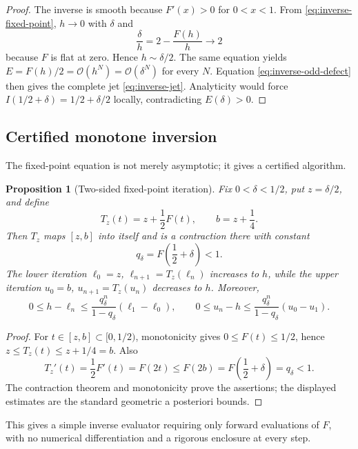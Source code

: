 \documentclass[11pt,oneside]{article}
\newtheorem{proposition}[theorem]{Proposition}
\theoremstyle{definition}
\theoremstyle{remark}
\newcommand{\bigO}{\mathcal O}
\begin{document}
\begin{proof}
The inverse is smooth because $F'(x)>0$ for $0<x<1$.  From \eqref{eq:inverse-fixed-point}, $h\to0$ with $\delta$ and
\[
 \frac\delta h=2-\frac{F(h)}h\longrightarrow2
\]
because $F$ is flat at zero.  Hence $h\sim\delta/2$.  The same equation yields
$E=F(h)/2=\bigO(h^N)=\bigO(\delta^N)$ for every $N$.  Equation \eqref{eq:inverse-odd-defect} then gives the complete jet \eqref{eq:inverse-jet}.  Analyticity would force $I(1/2+\delta)=1/2+\delta/2$ locally, contradicting $E(\delta)>0$.
\end{proof}

\subsection{Certified monotone inversion}
The fixed-point equation is not merely asymptotic; it gives a certified algorithm.

\begin{proposition}[Two-sided fixed-point iteration]
\label{prop:certified-iteration}
Fix $0<\delta<1/2$, put $z=\delta/2$, and define
\[
 T_z(t)=z+\frac12F(t),
 \qquad b=z+\frac14.
\]
Then $T_z$ maps $[z,b]$ into itself and is a contraction there with constant
\begin{equation}
 q_\delta=F\!\left(\frac12+\delta\right)<1.
 \label{eq:qdelta}
\end{equation}
The lower iteration $\ell_0=z$, $\ell_{n+1}=T_z(\ell_n)$ increases to $h$, while the upper iteration $u_0=b$, $u_{n+1}=T_z(u_n)$ decreases to $h$.  Moreover,
\begin{equation}
 0\le h-\ell_n\le\frac{q_\delta^n}{1-q_\delta}(\ell_1-\ell_0),
 \qquad
 0\le u_n-h\le\frac{q_\delta^n}{1-q_\delta}(u_0-u_1).
 \label{eq:iteration-errors}
\end{equation}
\end{proposition}

\begin{proof}
For $t\in[z,b]\subset[0,1/2)$, monotonicity gives $0\le F(t)\le1/2$, hence
$z\le T_z(t)\le z+1/4=b$.  Also
\[
 T_z'(t)=\frac12F'(t)=F(2t)
 \le F(2b)=F\!\left(\frac12+\delta\right)=q_\delta<1.
\]
The contraction theorem and monotonicity prove the assertions; the displayed estimates are the standard geometric a posteriori bounds.
\end{proof}

This gives a simple inverse evaluator requiring only forward evaluations of $F$, with no numerical differentiation and a rigorous enclosure at every step.
\end{document}
